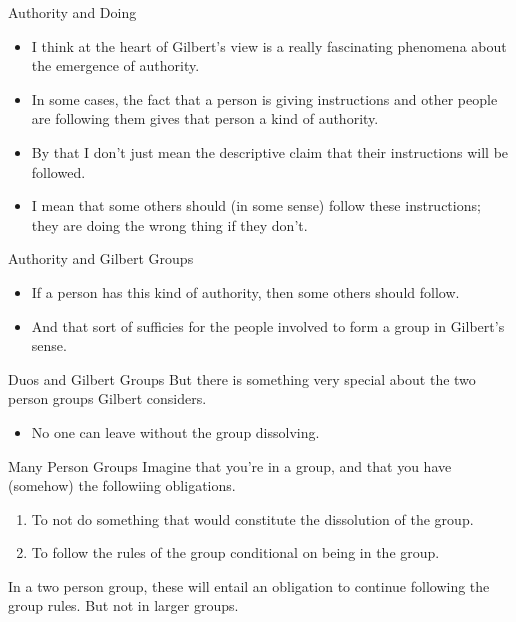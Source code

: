 \documentclass[
  ignorenonframetext,
]{beamer}
\providecommand{\tightlist}{%
  \setlength{\itemsep}{0pt}\setlength{\parskip}{0pt}}
\begin{document}
\begin{frame}{Authority and Doing}
\protect\hypertarget{authority-and-doing}{}
\begin{itemize}
\tightlist
\item
  I think at the heart of Gilbert's view is a really fascinating
  phenomena about the emergence of authority.
\item
  In some cases, the fact that a person is giving instructions and other
  people are following them gives that person a kind of authority.
\item
  By that I don't just mean the descriptive claim that their
  instructions will be followed.
\item
  I mean that some others should (in some sense) follow these
  instructions; they are doing the wrong thing if they don't.
\end{itemize}
\end{frame}

\begin{frame}{Authority and Gilbert Groups}
\protect\hypertarget{authority-and-gilbert-groups}{}
\begin{itemize}
\tightlist
\item
  If a person has this kind of authority, then some others should
  follow.
\item
  And that sort of sufficies for the people involved to form a group in
  Gilbert's sense.
\end{itemize}
\end{frame}

\begin{frame}{Duos and Gilbert Groups}
\protect\hypertarget{duos-and-gilbert-groups}{}
But there is something very special about the two person groups Gilbert
considers.

\begin{itemize}
\tightlist
\item
  No one can leave without the group dissolving.
\end{itemize}
\end{frame}

\begin{frame}{Many Person Groups}
\protect\hypertarget{many-person-groups}{}
Imagine that you're in a group, and that you have (somehow) the
followiing obligations.

\begin{enumerate}
\tightlist
\item
  To not do something that would constitute the dissolution of the
  group.
\item
  To follow the rules of the group conditional on being in the group.
\end{enumerate}

In a two person group, these will entail an obligation to continue
following the group rules. But not in larger groups.
\end{frame}
\end{document}
